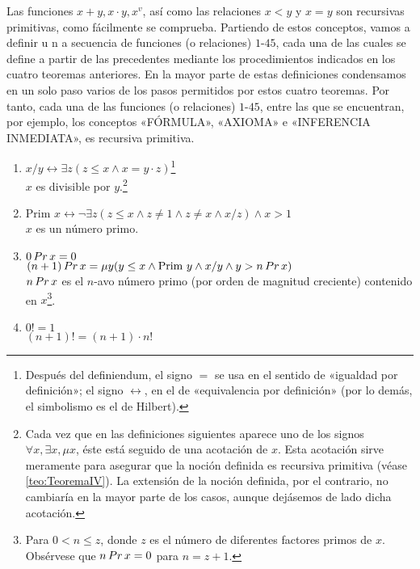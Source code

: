 Las funciones $x+y, x\cdot y, x^v$, así como las relaciones $x<y$ y $x=y$ son recursivas primitivas, como fácilmente se comprueba. Partiendo de estos conceptos, 
vamos a definir u n a secuencia de funciones (o relaciones) $1$-$45$, cada una de las cuales se define a partir de las precedentes mediante los procedimientos indicados
en los cuatro teoremas anteriores. En la mayor parte de estas definiciones condensamos en un solo paso varios de los pasos permitidos por estos cuatro teoremas. 
Por tanto, cada una de las funciones (o relaciones) $1$-$45$, entre las que se encuentran, por ejemplo, los conceptos «FÓRMULA», «AXIOMA» e «INFERENCIA INMEDIATA»,
es recursiva primitiva.

\begin{enumerate}
    \item $x/y \leftrightarrow \exists z (z \leq x \wedge x = y \cdot z)$\footnote{Después del definiendum, el signo $=$ se usa en el sentido de «igualdad por
            definición»; el signo $\leftrightarrow$, en el de «equivalencia por definición» (por lo demás, el simbolismo es el de Hilbert).}\\
            $x$ es divisible por $y$.\footnote{Cada vez que en las definiciones siguientes aparece uno de los signos $\forall x, \exists x, \mu x$, éste está 
            seguido de una acotación de $x$. Esta acotación sirve meramente para asegurar que la noción definida es recursiva primitiva (véase \autoref{teo:TeoremaIV}).
            La extensión de la noción definida, por el contrario, no cambiaría en la mayor parte de los casos, aunque dejásemos de lado dicha acotación.}
    \item $\text{Prim } x \leftrightarrow \lnot \exists z (z \leq x \wedge z \neq 1 \wedge z \neq x \wedge x/z) \wedge x>1$\\ $x$ es un número primo.
    \item $0 \thinspace Pr \thinspace x = 0$\\ 
            $(n+1) \thinspace Pr \thinspace x = \mu y (y \leq x \wedge \text{Prim } y \wedge x/y \wedge y>n \thinspace Pr \thinspace x)$ \\
            $n \thinspace Pr \thinspace x$ es el $n$-avo número primo (por orden de magnitud creciente) contenido en $x$\footnote{Para $0 < n \leq z$, donde
            $z$ es el número de diferentes factores primos de $x$. Obsérvese que $n \thinspace Pr \thinspace x = 0$ para $n = z+1$.}.
    \item $0! = 1$ \\ $(n+1)! = (n+1) \cdot n!$

\end{enumerate}
